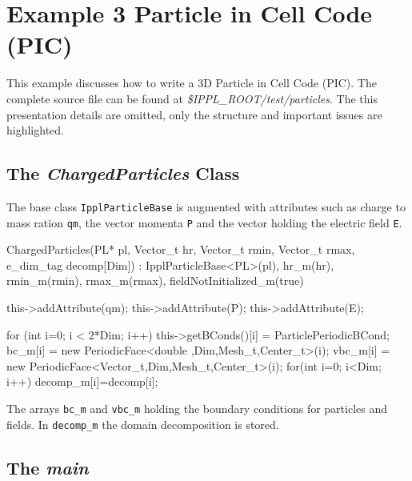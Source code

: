 
 
 \section{Example 3 Particle in Cell Code (PIC)}
 This example discusses how to write a 3D Particle in Cell Code (PIC). The 
 complete source file can be found at {\em \$IPPL\_ROOT/test/particles}. The 
 this presentation details are omitted, only the structure and important issues are
 highlighted. 
 \subsection{The {\em ChargedParticles} Class}
 The base class {\tt IpplParticleBase} is augmented with attributes such as charge to mass ration
 {\tt qm}, the vector momenta {\tt P} and the vector holding the electric field {\tt E}. 
 \begin{code}
 ChargedParticles(PL* pl, Vector_t hr, Vector_t rmin, 
                  Vector_t rmax, e_dim_tag decomp[Dim]) :
                  IpplParticleBase<PL>(pl),
                  hr_m(hr),
                  rmin_m(rmin),
                  rmax_m(rmax),
                  fieldNotInitialized_m(true)
{
    this->addAttribute(qm);
    this->addAttribute(P);
    this->addAttribute(E);

    for (int i=0; i < 2*Dim; i++) {
        this->getBConds()[i] = ParticlePeriodicBCond;
        bc_m[i]  = new PeriodicFace<double  ,Dim,Mesh_t,Center_t>(i);
        vbc_m[i] = new PeriodicFace<Vector_t,Dim,Mesh_t,Center_t>(i);
    }
    for(int i=0; i<Dim; i++)
        decomp_m[i]=decomp[i];
}
\end{code}
The arrays {\tt bc\_m} and {\tt vbc\_m} holding the boundary conditions for particles and fields.
In {\tt decomp\_m} the domain decomposition is stored.

\subsection{The {\em main}}

